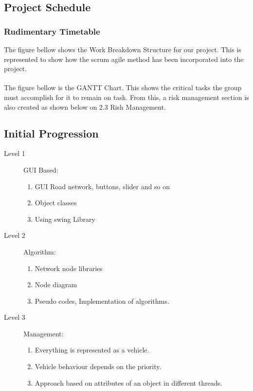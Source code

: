 \documentclass{article} \usepackage{graphicx}
\begin{document}
                \subsection{Project Schedule}
                \subsubsection{Rudimentary Timetable}
                    The figure bellow shows the Work Breakdown Structure for our project. This is represented to show how the scrum agile method has been incorporated into the project.\\
                    \\The figure bellow is the GANTT Chart. This shows the critical tasks the group must accomplish for it to remain on task. From this, a risk management section is also created as shown below on 2.3 Rish Management. 		
                \subsection{Initial Progression}
                \begin{description}
				 \item[Level 1] GUI Based:
                    \begin{enumerate}
                        \item GUI Road network, buttons, slider and so on 
                        \item Object classes
                        \item Using swing Library
                    \end{enumerate}
                 \item[Level 2] Algorithm:
                    \begin{enumerate}
                      \item Network node libraries
                      \item Node diagram
                      \item Pseudo codes, Implementation of algorithms.
                    \end{enumerate}
                 \item[Level 3] Management:
                    \begin{enumerate}
                      \item Everything is represented as a vehicle.
                      \item Vehicle behaviour depends on the priority.
                      \item Approach based on attributes of an object in different threads.
                    \end{enumerate}
                \end{description}
\end{document}
